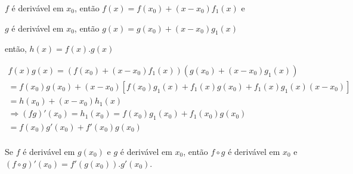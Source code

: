 \documentclass{book}
\begin{document}
\begin{dem}

$f$ \'{e} deriv\'avel em $x_0 $, ent\~ao $f\left( x \right) = f\left( {x_0
} \right) + \left( {x - x_0 } \right)f_1 \left( x \right)$ e

$g$ \'{e} deriv\'avel em $x_0 $, ent\~ao $g\left( x \right) = g\left( {x_0
} \right) + \left( {x - x_0 } \right)g_1 \left( x \right)$

ent\~ao, $h\left( x \right) = f\left( x \right).g\left( x \right)$

\[
\begin{array}{l}
f\left( x \right)g\left( x \right) = \left( {f\left( {x_0 } \right) +
\left( {x - x_0 } \right)f_1 \left( x \right)} \right)\left( {g\left( {x_0 }
\right) + \left( {x - x_0 } \right)g_1 \left( x \right)} \right) \\
= f\left( {x_0 } \right)g\left( {x_0 } \right) + \left( {x - x_0 }
\right)\left[ {f\left( {x_0 } \right)g_1 \left( x \right) + f_1 \left( x
\right)g\left( {x_0 } \right) + f_1 \left( x \right)g_1 \left( x
\right)\left( {x - x_0 } \right)} \right] \\
= h\left( {x_0 } \right) + \left( {x - x_0 } \right)h_1 \left( x \right) \\
\Rightarrow \left( {fg} \right)'\left( {x_0 } \right) = h_1 \left( {x_0 }
\right) = f\left( {x_0 } \right)g_1 \left( {x_0 } \right) + f_1 \left( {x_0
} \right)g\left( {x_0 } \right) \\
= f\left( {x_0 } \right)g'\left( {x_0 } \right) + f'\left( {x_0 }
\right)g\left( {x_0 } \right) \\
\end{array}
\]

\end{dem}

\begin{teo}

Se $f$ \'{e} deriv\'avel em $g\left( {x_0 } \right)$ e $g$ \'{e}
deriv\'avel em $x_0 $, ent\~ao $f \circ g$ \'{e} deriv\'avel em $x_0 $
e $\left( {f \circ g} \right)'\left( {x_0 } \right) = f'\left( {g\left( {x_0
} \right)} \right).g'\left( {x_0 } \right)$.

\end{teo}
\end{document}
